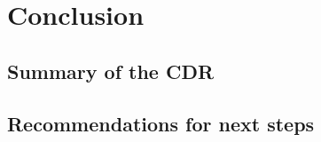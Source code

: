 \documentclass[11pt]{article}
\begin{document}
\section{Conclusion}

\subsection{Summary of the CDR}

\subsection{Recommendations for next steps}
\end{document}
